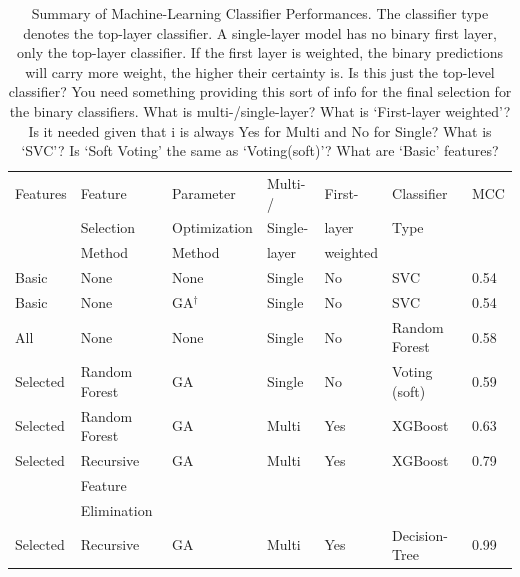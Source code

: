 \documentclass[12pt]{article}
\newcommand{\lilian}[1]{ {\color{red}{\bfseries Lilian:} #1}}
\begin{document}
\begin{table}
  \centering
  \caption{Summary of Machine-Learning Classifier Performances. The classifier type denotes the top-layer classifier. A single-layer model has no binary first layer, only the top-layer classifier. If the first layer is weighted, the binary predictions will carry more weight, the higher their certainty is.  \lilian{Is this just the top-level classifier? You need something providing this sort of info for the final selection for the binary classifiers. What is multi-/single-layer? What is `First-layer weighted'? Is it needed given that i is always Yes for Multi and No for Single? What is `SVC'? Is `Soft Voting' the same as `Voting(soft)'? What are `Basic' features?}}
  \label{tab:results_table}

  \small
  \begin{tabular}{lllllll}\hline
    Features        & Feature       & Parameter         & Multi- / & First-    & Classifier    & MCC  \\
                    & Selection     & Optimization      & Single-  & layer     & Type          &      \\
                    & Method        & Method            & layer    & weighted  &               &      \\ \hline
    Basic           & None          & None              & Single   & No        & SVC           & 0.54 \\
    Basic           & None          & GA$^\dag$         & Single   & No        & SVC           & 0.54 \\
    All             & None          & None              & Single   & No        & Random Forest & 0.58 \\
    Selected        & Random Forest & GA                & Single   & No        & Voting (soft)   & 0.59 \\
    Selected        & Random Forest & GA                & Multi    & Yes       & XGBoost       & 0.63 \\
    Selected        & Recursive     & GA                & Multi    & Yes       & XGBoost       & 0.79 \\
                    & Feature       &                   &          &           &               &      \\
                    & Elimination   &                   &          &           &               &      \\
    Selected        & Recursive     & GA                & Multi    & Yes       & Decision-Tree & 0.99 \\

\end{tabular}
\end{table}
\end{document}
